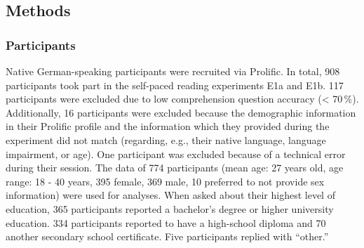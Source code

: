 \documentclass[a4paper, man, floatsintext]{apa7}
\begin{document}

\subsection{Methods}
\subsubsection{Participants}





Native German-speaking participants were recruited via Prolific. In total, 908 participants took part in the self-paced reading experiments E1a and E1b. 117 participants were excluded due to low comprehension question accuracy (< 70\,\%). Additionally, 16 participants were excluded because the demographic information in their Prolific profile and the information which they provided during the experiment did not match (regarding, e.g., their native language, language impairment, or age). One participant was excluded because of a technical error during their session. The data of 774 participants (mean age: 27 years old, age range: 18 - 40 years, 395 female, 369 male, 10 preferred to not provide sex information) were used for analyses. When asked about their highest level of education, 365 participants reported a bachelor's degree or higher university education. 334 participants reported to have a high-school diploma and 70 another secondary school certificate. Five participants replied with ``other.'' 
\end{document}
